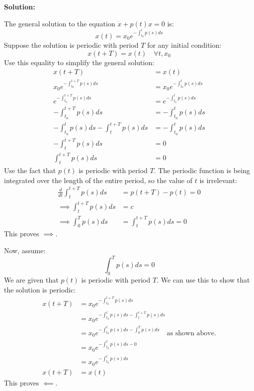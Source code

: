 \documentclass[12pt]{article}
\newenvironment{solution}{
    \textbf{Solution:}
    
}{
    
    \vspace{2em}
}
\begin{document}
\begin{solution}
The general solution to the equation $\dot{x} + p(t)x = 0$ is:
    \[
        x(t) = x_0 e^{-\int_{t_0}^t p(s)ds}
    \]
Suppose the solution is periodic with period \(T\) for any initial condition:
    \[
        x(t+T) = x(t) \quad \forall t, x_0
    \]
Use this equality to simplify the general solution:
    \[
        \begin{aligned}
            x(t+T) &= x(t)\\
            x_0 e^{-\int_{t_0}^{t+T} p(s)ds} &= x_0 e^{-\int_{t_0}^t p(s)ds}\\
            e^{-\int_{t_0}^{t+T} p(s)ds} &= e^{-\int_{t_0}^t p(s)ds}\\
            -\int_{t_0}^{t+T} p(s)ds &= -\int_{t_0}^t p(s)ds\\
            -\int_{t_0}^t p(s)ds - \int_{t}^{t+T} p(s)ds &= -\int_{t_0}^{t} p(s)ds\\
            -\int_{t}^{t+T} p(s)ds &= 0\\
            \int_{t}^{t+T} p(s)ds &= 0
        \end{aligned}
    \]
Use the fact that \(p(t)\) is periodic with period \(T\). The periodic function is being integrated over the length of the entire period, so the value of \(t\) is irrelevant:
    \[
        \begin{aligned}
            \frac{d}{dt}\int_{t}^{t+T} p(s)ds &= p(t+T)-p(t) = 0\\
            \implies \int_{t}^{t+T} p(s)ds &= c\\
            \implies \int_{0}^{T} p(s)ds &= \int_{t}^{t+T} p(s)ds = 0
        \end{aligned}
    \]
This proves \(\implies\).

Now, assume:
    \[
        \int_{0}^T p(s)ds = 0
    \]
We are given that \(p(t)\) is periodic with period \(T\). We can use this to show that the solution is periodic:
    \[
        \begin{aligned}
            x(t+T) &= x_0 e^{-\int_{t_0}^{t+T} p(s)ds}\\
            &= x_0 e^{-\int_{t_0}^{t} p(s)ds - \int_{t}^{t+T} p(s)ds} \\
            &= x_0 e^{-\int_{t_0}^{t} p(s)ds - \int_{0}^{T} p(s)ds} \quad \text{as shown above.}\\
            &= x_0 e^{-\int_{t_0}^{t} p(s)ds-0}\\
            &= x_0 e^{-\int_{t_0}^{t} p(s)  ds}\\
            x(t+T) &= x(t)
        \end{aligned}
    \]
This proves \(\impliedby\).
\end{solution}
\end{document}
